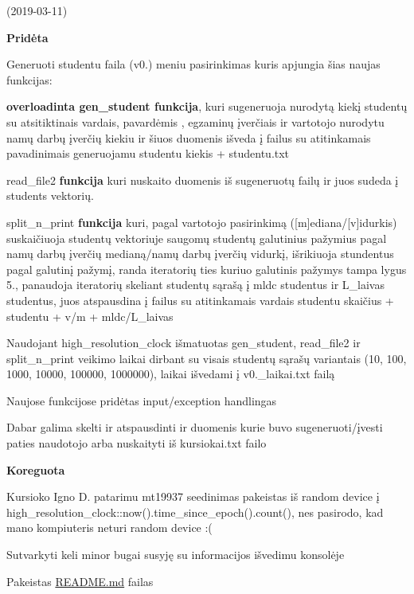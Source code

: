 (2019-\/03-\/11) 

{\bfseries{Pridėta}}


\begin{DoxyItemize}
\item {\ttfamily Generuoti studentu faila (v0.)} meniu pasirinkimas kuris apjungia šias naujas funkcijas\+:
\item {\bfseries{overload\textquotesingle{}inta {\ttfamily gen\+\_\+student} funkcija}}, kuri sugeneruoja nurodytą kiekį studentų su atsitiktinais vardais, pavardėmis , egzaminų įverčiais ir vartotojo nurodytu namų darbų įverčių kiekiu ir šiuos duomenis išveda į failus su atitinkamais pavadinimais {\ttfamily generuojamu studentu kiekis + studentu.\+txt}
\item {\ttfamily read\+\_\+file2} {\bfseries{funkcija}} kuri nuskaito duomenis iš sugeneruotų failų ir juos sudeda į students vektorių.
\item {\ttfamily split\+\_\+n\+\_\+print} {\bfseries{funkcija}} kuri, pagal vartotojo pasirinkimą (\mbox{[}m\mbox{]}ediana/\mbox{[}v\mbox{]}idurkis) suskaičiuoja studentų vektoriuje saugomų studentų galutinius pažymius pagal namų darbų įverčių medianą/namų darbų įverčių vidurkį, išrikiuoja stundentus pagal galutinį pažymį, randa iteratorių ties kuriuo galutinis pažymys tampa lygus 5., panaudoja iteratorių skeliant studentų sąrašą į {\ttfamily mldc} studentus ir {\ttfamily L\+\_\+laivas} studentus, juos atspausdina į failus su atitinkamais vardais {\ttfamily studentu skaičius + studentu + v/m + mldc/\+L\+\_\+laivas}
\item Naudojant {\ttfamily high\+\_\+resolution\+\_\+clock} išmatuotas {\ttfamily gen\+\_\+student}, {\ttfamily read\+\_\+file2} ir {\ttfamily split\+\_\+n\+\_\+print} veikimo laikai dirbant su visais studentų sąrašų variantais (10, 100, 1000, 10000, 100000, 1000000), laikai išvedami į {\ttfamily v0.\+\_\+laikai.\+txt} failą
\item Naujose funkcijose pridėtas input/exception handling\textquotesingle{}as
\item Dabar galima skelti ir atspausdinti ir duomenis kurie buvo sugeneruoti/įvesti paties naudotojo arba nuskaityti iš kursiokai.\+txt failo
\end{DoxyItemize}

{\bfseries{Koreguota}}


\begin{DoxyItemize}
\item Kursioko Igno D. patarimu mt19937 seedinimas pakeistas iš random device į {\ttfamily high\+\_\+resolution\+\_\+clock\+::now().time\+\_\+since\+\_\+epoch().count()}, nes pasirodo, kad mano kompiuteris neturi random device \+:(
\item Sutvarkyti keli minor bug\textquotesingle{}ai susyję su informacijos išvedimu konsolėje
\item Pakeistas \mbox{\hyperlink{_r_e_a_d_m_e_8md}{R\+E\+A\+D\+M\+E.\+md}} failas
\end{DoxyItemize}

